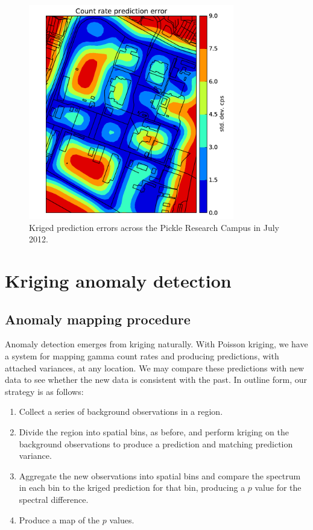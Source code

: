 \begin{figure}
  \centering
  \includegraphics[width=0.8\textwidth]{figures/prc-cps-var-contour.pdf}
  \caption{Kriged prediction errors across the Pickle Research Campus in
    July 2012.}
  \label{prc-cps-var-contour}
\end{figure}

\section{Kriging anomaly detection}

\subsection{Anomaly mapping procedure}\label{krige-anomaly-mapping}

Anomaly detection emerges from kriging naturally. With Poisson kriging, we have
a system for mapping gamma count rates and producing predictions, with attached
variances, at any location. We may compare these predictions with new data to
see whether the new data is consistent with the past. In outline form, our
strategy is as follows:

\begin{enumerate}
  \item Collect a series of background observations in a region.
  \item Divide the region into spatial bins, as before, and perform kriging on
    the background observations to produce a prediction and matching prediction
    variance.
  \item Aggregate the new observations into spatial bins and compare the
    spectrum in each bin to the kriged prediction for that bin, producing a
    \(p\) value for the spectral difference.
  \item Produce a map of the \(p\) values.
\end{enumerate}

